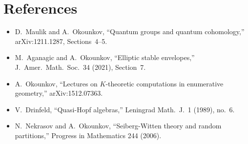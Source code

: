 \documentclass[11pt]{amsart}
\theoremstyle{definition}
\theoremstyle{remark}
\begin{document}
\section{References}

\begin{itemize}
\item D.~Maulik and A.~Okounkov, ``Quantum groups and quantum cohomology,''
arXiv:1211.1287, Sections~4--5.
\item M.~Aganagic and A.~Okounkov, ``Elliptic stable envelopes,''
J.\ Amer.\ Math.\ Soc.\ 34 (2021), Section~7.
\item A.~Okounkov, ``Lectures on $K$-theoretic computations in enumerative
geometry,'' arXiv:1512.07363.
\item V.~Drinfeld, ``Quasi-Hopf algebras,'' Leningrad Math.\ J.\ 1
(1989), no.~6.
\item N.~Nekrasov and A.~Okounkov, ``Seiberg-Witten theory and random
partitions,'' Progress in Mathematics 244 (2006).
\end{itemize}
\end{document}
